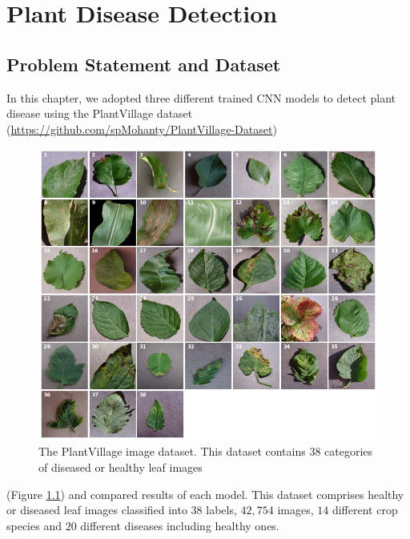 \documentclass[12pt]{report}
\numberwithin{equation}{section}
\begin{document}
\chapter{Plant Disease Detection}
\setcounter{section}{-1}

\section{Problem Statement and Dataset}
In this chapter, we adopted three different trained CNN models to detect plant disease using the PlantVillage dataset (\url{https://github.com/spMohanty/PlantVillage-Dataset}) 
\begin{figure}[H]
\centering
\includegraphics[scale=0.4]{png/image_per_specie.png}
\caption{The PlantVillage image dataset. This
dataset contains 38 categories of diseased or healthy leaf images}
\label{fig:data}
\end{figure} \noindent
(Figure \ref{fig:data}) and compared results of each model. This dataset comprises healthy  or diseased leaf images classified into $38$ labels, $42,754$ images, $14$ different crop species and $20$ different diseases including healthy ones. 
\end{document}
